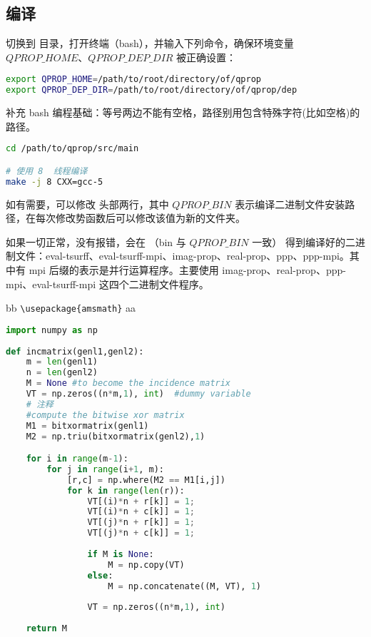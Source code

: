 \subsection{编译}
切换到  目录，打开终端（bash），并输入下列命令，确保环境变量 $QPROP\_HOME$、$QPROP\_DEP\_DIR$ 被正确设置：
\begin{lstlisting}[language=bash]
export QPROP_HOME=/path/to/root/directory/of/qprop
export QPROP_DEP_DIR=/path/to/root/directory/of/qprop/dep
\end{lstlisting}

补充 bash 编程基础：等号两边不能有空格，路径别用包含特殊字符(比如空格)的路径。

\begin{lstlisting}[language=bash]
cd /path/to/qprop/src/main

# 使用 8  线程编译
make -j 8 CXX=gcc-5

\end{lstlisting}

如有需要，可以修改  头部两行，其中 $QPROP\_BIN$ 表示编译二进制文件安装路径，在每次修改势函数后可以修改该值为新的文件夹。


如果一切正常，没有报错，会在 （bin 与 $QPROP\_BIN$ 一致） 得到编译好的二进制文件：eval-tsurff、eval-tsurff-mpi、imag-prop、real-prop、ppp、ppp-mpi。其中有 mpi 后缀的表示是并行运算程序。主要使用 imag-prop、real-prop、ppp-mpi、eval-tsurff-mpi 这四个二进制文件程序。


\iffalse
bb \verb|\usepackage{amsmath}| aa

\begin{lstlisting}[language=Python]
import numpy as np
    
def incmatrix(genl1,genl2):
    m = len(genl1)
    n = len(genl2)
    M = None #to become the incidence matrix
    VT = np.zeros((n*m,1), int)  #dummy variable
    # 注释 
    #compute the bitwise xor matrix
    M1 = bitxormatrix(genl1)
    M2 = np.triu(bitxormatrix(genl2),1) 

    for i in range(m-1):
        for j in range(i+1, m):
            [r,c] = np.where(M2 == M1[i,j])
            for k in range(len(r)):
                VT[(i)*n + r[k]] = 1;
                VT[(i)*n + c[k]] = 1;
                VT[(j)*n + r[k]] = 1;
                VT[(j)*n + c[k]] = 1;
                
                if M is None:
                    M = np.copy(VT)
                else:
                    M = np.concatenate((M, VT), 1)
                
                VT = np.zeros((n*m,1), int)
    
    return M
\end{lstlisting}

